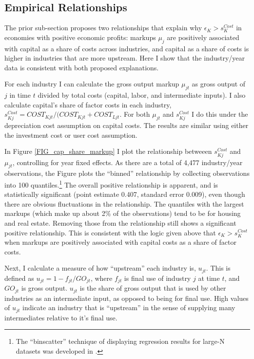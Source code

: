 \documentclass[11pt]{article}
\begin{document}
\subsection{Empirical Relationships}
The prior sub-section proposes two relationships that explain why $\epsilon_K > s_K^{Cost}$ in economies with positive economic profits: markups $\mu_j$ are positively associated with capital as a share of costs across industries, and capital as a share of costs is higher in industries that are more upstream. Here I show that the industry/year data is consistent with both proposed explanations.

For each industry I can calculate the gross output markup $\mu_{jt}$ as gross output of $j$ in time $t$ divided by total costs (capital, labor, and intermediate inputs). I also calculate capital's share of factor costs in each industry, $s_{Kj}^{Cost} = COST_{Kjt}/(COST_{Kjt} + COST_{Ljt}$. For both $\mu_{jt}$ and $s_{Kj}^{Cost}$ I do this under the depreciation cost assumption on capital costs. The results are similar using either the investment cost or user cost assumption.

In Figure \ref{FIG_cap_share_markup} I plot the relationship betweeen $s_{Kj}^{Cost}$ and $\mu_{jt}$, controlling for year fixed effects. As there are a total of 4,477 industry/year observations, the Figure plots the ``binned'' relationship by collecting observations into 100 quantiles.\footnote{The ``binscatter'' technique of displaying regression results for large-N datasets was developed in \cite{cfs2013}.} The overall positive relationship is apparent, and is statistically significant (point estimate 0.407, standard error 0.009), even though there are obvious fluctuations in the relationship. The quantiles with the largest markups (which make up about 2\% of the observations) tend to be for housing and real estate. Removing those from the relationship still shows a significant positive relationship. This is consistent with the logic given above that $\epsilon_K > s_K^{Cost}$ when markups are positively associated with capital costs as a share of factor costs.

Next, I calculate a measure of how ``upstream'' each industry is, $u_{jt}$. This is defined as $u_{jt} = 1 - f_{jt}/GO_{jt}$, where $f_{jt}$ is final use of industry $j$ at time $t$, and $GO_{jt}$ is gross output. $u_{jt}$ is the share of gross output that is used by other industries as an intermediate input, as opposed to being for final use. High values of $u_{jt}$ indicate an industry that is ``upstream'' in the sense of supplying many intermediates relative to it's final use.
\end{document}

